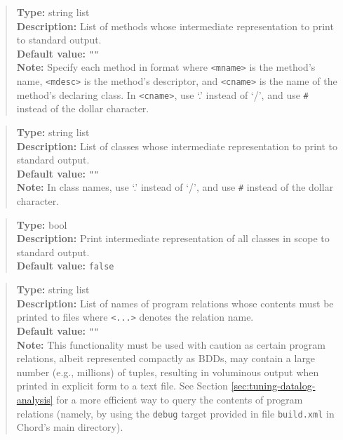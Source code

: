 \begin{quote}
{\bf Type:} string list  \\
{\bf Description:} List of methods whose intermediate representation to print to standard output. \\
{\bf Default value:} {\tt ""} \\
{\bf Note:} Specify each method in format  where {\tt <mname>} is the method's name, {\tt <mdesc>} is the method's descriptor, and {\tt <cname>} is the name of the method's declaring class. In {\tt <cname>}, use `.' instead of `/', and use {\tt \#} instead of the dollar character. 
\end{quote}

\begin{quote}
{\bf Type:} string list  \\
{\bf Description:} List of classes whose intermediate representation to print to standard output. \\
{\bf Default value:} {\tt ""} \\
{\bf Note:} In class names, use `.' instead of `/', and use {\tt \#} instead of the dollar character. 
\end{quote}

\begin{quote}
{\bf Type:} bool \\
{\bf Description:} Print intermediate representation of all classes in scope to standard output. \\
{\bf Default value:} {\tt false}
\end{quote}

\begin{quote}
{\bf Type:} string list  \\
{\bf Description:} List of names of program relations whose contents must be printed to files  where {\tt <...>} denotes the relation name. \\
{\bf Default value:} {\tt ""} \\
{\bf Note:} This functionality must be used with caution as certain program relations, albeit represented compactly as BDDs, may contain a large number (e.g., millions) of tuples, resulting in voluminous output when printed in explicit form to a text file.  See Section \ref{sec:tuning-datalog-analysis} for a more efficient way to query the contents of program relations (namely, by using the {\tt debug} target provided in file {\tt build.xml} in Chord's main directory).
\end{quote}

